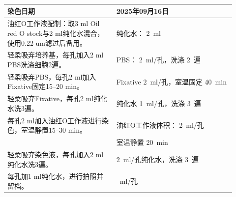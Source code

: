 \documentclass[UTF8,10pt,a4paper,fontset=fandol]{ctexart}
\newcommand{\fieldvalue}[1]{#1}
\newcommand{\handwritten}[1]{#1}
\begin{document}
\noindent
\begin{tabular}{|p{0.44\linewidth}|p{0.48\linewidth}|}
\hline
染色日期 &
\fieldvalue{\handwritten{2025年09月16日}}\\ \hline
油红O工作液配制：取3 ml Oil red O stock与2 ml纯化水混合，使用0.22 um滤过后备用。&
纯化水：
\fieldvalue{\handwritten{2}}\ ml\\ \hline
轻柔吸弃培养基，每孔加入2 ml PBS洗涤细胞2遍。&
PBS：
\fieldvalue{\handwritten{2}}\ ml/孔，洗涤
\fieldvalue{\handwritten{2}}\ 遍\\ \hline
轻柔吸弃PBS，每孔2 ml加入Fixative固定15--20 min。&
Fixative
\fieldvalue{\handwritten{2}}\ ml/孔，室温固定
\fieldvalue{\handwritten{40}}\ min\\ \hline
轻柔吸弃Fixative，每孔2 ml纯化水洗3遍。&
纯化水
\fieldvalue{\handwritten{1}}\ ml/孔，洗涤
\fieldvalue{\handwritten{3}}\ 遍\\ \hline
每孔2 ml加入油红O工作液进行染色，室温静置15--30 min。&
油红O工作液体积：
\fieldvalue{\handwritten{2}}\ ml/孔\\
& 室温静置
\fieldvalue{\handwritten{20}}\ min\\ \hline
轻柔吸弃染色液，每孔加入2 ml纯化水洗3遍。&
\fieldvalue{\handwritten{2}}\ ml/孔纯化水，洗涤
\fieldvalue{\handwritten{3}}\ 遍\\ \hline
每孔加1 ml纯化水，进行拍照并留档。&
\underline{\hspace{3cm}}\ ml/孔\\ \hline
\end{tabular}

\vspace{2pt}
\end{document}
